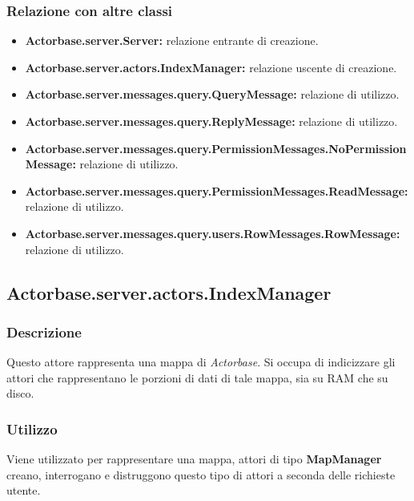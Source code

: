 \documentclass[a4paper]{article}
\begin{document}
			\subsubsection{Relazione con altre classi}
				\begin{itemize}
					\item \textbf{Actorbase.server.Server:} relazione entrante di creazione.
					\item \textbf{Actorbase.server.actors.IndexManager:} relazione uscente di creazione.
					\item \textbf{Actorbase.server.messages.query.QueryMessage:} relazione di utilizzo.
					\item \textbf{Actorbase.server.messages.query.ReplyMessage:} relazione di utilizzo.
					\item \textbf{Actorbase.server.messages.query.PermissionMessages.NoPermissionMessage:} relazione di utilizzo.
					\item \textbf{Actorbase.server.messages.query.PermissionMessages.ReadMessage:} relazione di utilizzo.
					\item \textbf{Actorbase.server.messages.query.users.RowMessages.RowMessage:} relazione di utilizzo.
				\end{itemize}
				
				\subsection{Actorbase.server.actors.IndexManager}
			\subsubsection{Descrizione}
				Questo attore rappresenta una mappa di \emph{Actorbase}. Si occupa di indicizzare gli attori che rappresentano le porzioni di dati di tale mappa, sia su RAM che su disco.
				
			\subsubsection{Utilizzo}
				Viene utilizzato per rappresentare una mappa, attori di tipo \textbf{MapManager} creano, interrogano e distruggono questo tipo di attori a seconda delle richieste utente.
				
\end{document}

